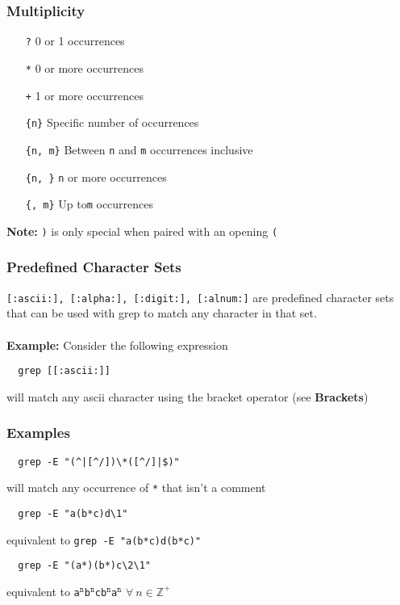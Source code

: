 \documentclass[13pt]{article}
\begin{document}
\subsubsection{Multiplicity}
\begin{itemize}[label=]
\item [\texttt{?}] 0 or 1 occurrences
\item [\texttt{*}] 0 or more occurrences
\item [\texttt{+}] 1 or more occurrences
\item [\texttt{\{n\}}] Specific number of occurrences
\item [\texttt{\{n, m\}}] Between \texttt{n} and \texttt{m} occurrences inclusive
\item [\texttt{\{n, \}}] \texttt{n} or more occurrences
\item [\texttt{\{, m\}}] Up to\texttt{m} occurrences
\end{itemize}
\textbf{Note:} \texttt{)} is only special when paired with an opening \texttt{(}

\subsubsection{Predefined Character Sets}
\texttt{[:ascii:], [:alpha:], [:digit:], [:alnum:]} are predefined character sets that can be used with grep to match any character in that set. \\ \\
\textbf{Example:} Consider the following expression
\begin{verbatim}
  grep [[:ascii:]] \end{verbatim}
will match any ascii character using the bracket operator (see \textbf{Brackets})
\subsubsection*{Examples}
\begin{verbatim}
  grep -E "(^|[^/])\*([^/]|$)" \end{verbatim}
will match any occurrence of \texttt{*} that isn't a comment
\begin{verbatim}
  grep -E "a(b*c)d\1" \end{verbatim}
equivalent to \texttt{grep -E "a(b*c)d(b*c)"}
\begin{verbatim}
  grep -E "(a*)(b*)c\2\1" \end{verbatim}
equivalent to \texttt{a$^\texttt{n}$b$^\texttt{n}$cb$^\texttt{n}$a$^\texttt{n}$} $\forall \ n \in \mathbb{Z}^+$
\end{document}
